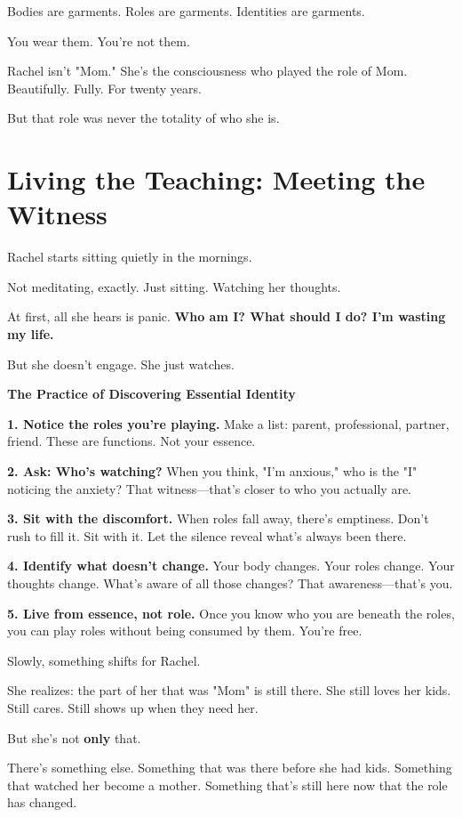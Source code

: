 \documentclass[11pt,twoside]{book}
\begin{document}
Bodies are garments. Roles are garments. Identities are garments.

You wear them. You're not them.

Rachel isn't "Mom." She's the consciousness who played the role of Mom. Beautifully. Fully. For twenty years.

But that role was never the totality of who she is.

\section*{Living the Teaching: Meeting the Witness}

Rachel starts sitting quietly in the mornings.

Not meditating, exactly. Just sitting. Watching her thoughts.

At first, all she hears is panic. \textbf{Who am I? What should I do? I'm wasting my life.}

But she doesn't engage. She just watches.

\begin{practicebox}
\textbf{The Practice of Discovering Essential Identity}

\textbf{1. Notice the roles you're playing.} Make a list: parent, professional, partner, friend. These are functions. Not your essence.

\textbf{2. Ask: Who's watching?} When you think, "I'm anxious," who is the "I" noticing the anxiety? That witness—that's closer to who you actually are.

\textbf{3. Sit with the discomfort.} When roles fall away, there's emptiness. Don't rush to fill it. Sit with it. Let the silence reveal what's always been there.

\textbf{4. Identify what doesn't change.} Your body changes. Your roles change. Your thoughts change. What's aware of all those changes? That awareness—that's you.

\textbf{5. Live from essence, not role.} Once you know who you are beneath the roles, you can play roles without being consumed by them. You're free.
\end{practicebox}

Slowly, something shifts for Rachel.

She realizes: the part of her that was "Mom" is still there. She still loves her kids. Still cares. Still shows up when they need her.

But she's not \textbf{only} that.

There's something else. Something that was there before she had kids. Something that watched her become a mother. Something that's still here now that the role has changed.
\end{document}
